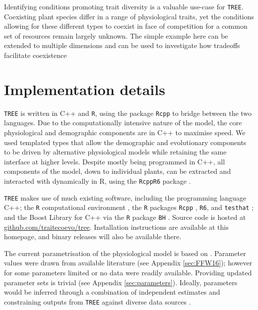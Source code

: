 \documentclass[a4paper,11pt]{article}
\begin{document}
Identifying conditions promoting trait diversity is a valuable use-case
for \texttt{TREE}. Coexisting plant species differ in a range of physiological
traits, yet the conditions allowing for these different types to coexist
in face of competition for a common set of resources remain largely
unknown. The simple example here can be extended to multiple dimensions
and can be used to investigate how tradeoffs facilitate coexistence
\citep{Falster-2015}

\section{Implementation details}

\texttt{TREE} is written in C++ and \texttt{R}, using the package \texttt{Rcpp}
\citep{Eddelbuettel-2011, Eddelbuettel-2013} to bridge between the two
languages. Due to the computationally intensive nature of the model, the
core physiological and demographic components are in C++ to maximise
speed. We used templated types that allow the demographic and evolutionary
components to be driven by alternative physiological models while
retaining the same interface at higher levels. Despite mostly being
programmed in C++, all components of the model, down to individual
plants, can be extracted and interacted with dynamically in R, using the
\texttt{RcppR6} package \citep{RcppR6}.

\texttt{TREE} makes use of much existing software, including the programming
language C++; the \texttt{R} computational environment \citep{R-2015}, the \texttt{R}
packages \texttt{Rcpp} \citep{Eddelbuettel-2011, Eddelbuettel-2013},
\texttt{R6}\citep{Chang-2014}, and \texttt{testhat}
\citep{Wickham-2011}; and the Boost Library for C++
\citep{Schaling-2014} via the \texttt{R} package \texttt{BH}
\citep{Eddelbuettel-2015}. Source code is hosted at
\href{https://github.com/traitecoevo/tree}{github.com/traitecoevo/tree}.
Installation instructions are available at this homepage, and binary
releases will also be available there.

The current parametrisation of the physiological model is based on
\citet{Falster-2011}. Parameter values were drawn from available literature (see
Appendix \ref{sec:FFW16}); however for some parameters limited or no data were
readily available. Providing updated parameter sets is trivial (see Appendix
\ref{sec:parameters}). Ideally, parameters would be inferred through a combination of
independent estimates and constraining outputs from \texttt{TREE} against diverse data sources
\citep{Lebauer-2012, Keenan-2013}.
\end{document}
